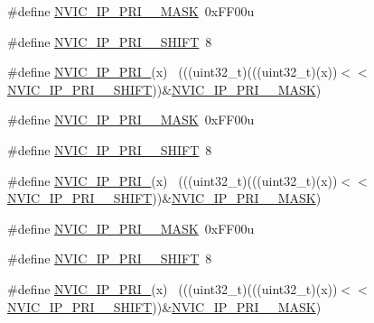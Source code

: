 \begin{DoxyCompactItemize}
\item 
\#define \hyperlink{group___n_v_i_c___register___masks_ga814cd4772457cb9ecbbca3e920fd137e}{N\+V\+I\+C\+\_\+\+I\+P\+\_\+\+P\+R\+I\+\_\+\_\+\+M\+A\+SK}~0x\+F\+F00u
\item 
\#define \hyperlink{group___n_v_i_c___register___masks_ga04e4114079b0bdec123a9ec1cbf753ac}{N\+V\+I\+C\+\_\+\+I\+P\+\_\+\+P\+R\+I\+\_\+\_\+\+S\+H\+I\+FT}~8
\item 
\#define \hyperlink{group___n_v_i_c___register___masks_gae8757ec0ce6792ef8b753d66ae926b93}{N\+V\+I\+C\+\_\+\+I\+P\+\_\+\+P\+R\+I\+\_}(x)                                            ~(((uint32\+\_\+t)(((uint32\+\_\+t)(x))$<$$<$\hyperlink{group___n_v_i_c___register___masks_ga04e4114079b0bdec123a9ec1cbf753ac}{N\+V\+I\+C\+\_\+\+I\+P\+\_\+\+P\+R\+I\+\_\+\_\+\+S\+H\+I\+FT}))\&\hyperlink{group___n_v_i_c___register___masks_ga814cd4772457cb9ecbbca3e920fd137e}{N\+V\+I\+C\+\_\+\+I\+P\+\_\+\+P\+R\+I\+\_\+\_\+\+M\+A\+SK})
\item 
\#define \hyperlink{group___n_v_i_c___register___masks_ga0c51910ba3a4a9024cc9ad093faac6c2}{N\+V\+I\+C\+\_\+\+I\+P\+\_\+\+P\+R\+I\+\_\+\_\+\+M\+A\+SK}~0x\+F\+F00u
\item 
\#define \hyperlink{group___n_v_i_c___register___masks_ga9e589d5827b433115674feea8762dc20}{N\+V\+I\+C\+\_\+\+I\+P\+\_\+\+P\+R\+I\+\_\+\_\+\+S\+H\+I\+FT}~8
\item 
\#define \hyperlink{group___n_v_i_c___register___masks_ga26a6c9accb8900ba18cfd32f4e730fef}{N\+V\+I\+C\+\_\+\+I\+P\+\_\+\+P\+R\+I\+\_}(x)                                              ~(((uint32\+\_\+t)(((uint32\+\_\+t)(x))$<$$<$\hyperlink{group___n_v_i_c___register___masks_ga9e589d5827b433115674feea8762dc20}{N\+V\+I\+C\+\_\+\+I\+P\+\_\+\+P\+R\+I\+\_\+\_\+\+S\+H\+I\+FT}))\&\hyperlink{group___n_v_i_c___register___masks_ga0c51910ba3a4a9024cc9ad093faac6c2}{N\+V\+I\+C\+\_\+\+I\+P\+\_\+\+P\+R\+I\+\_\+\_\+\+M\+A\+SK})
\item 
\#define \hyperlink{group___n_v_i_c___register___masks_ga2eade430981b179a17768ad0d883efa4}{N\+V\+I\+C\+\_\+\+I\+P\+\_\+\+P\+R\+I\+\_\+\_\+\+M\+A\+SK}~0x\+F\+F00u
\item 
\#define \hyperlink{group___n_v_i_c___register___masks_ga95c8fd016e14f74793bc8f6f684bf9ba}{N\+V\+I\+C\+\_\+\+I\+P\+\_\+\+P\+R\+I\+\_\+\_\+\+S\+H\+I\+FT}~8
\item 
\#define \hyperlink{group___n_v_i_c___register___masks_ga87ea337a3015c64ada3fcf554d6bfd1b}{N\+V\+I\+C\+\_\+\+I\+P\+\_\+\+P\+R\+I\+\_}(x)                                              ~(((uint32\+\_\+t)(((uint32\+\_\+t)(x))$<$$<$\hyperlink{group___n_v_i_c___register___masks_ga95c8fd016e14f74793bc8f6f684bf9ba}{N\+V\+I\+C\+\_\+\+I\+P\+\_\+\+P\+R\+I\+\_\+\_\+\+S\+H\+I\+FT}))\&\hyperlink{group___n_v_i_c___register___masks_ga2eade430981b179a17768ad0d883efa4}{N\+V\+I\+C\+\_\+\+I\+P\+\_\+\+P\+R\+I\+\_\+\_\+\+M\+A\+SK})
$$
\end{DoxyCompactItemize}
